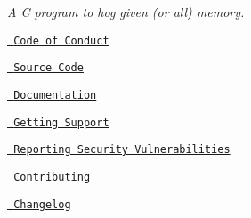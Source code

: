 \label{index_md_README}%
%
 {\itshape A C program to hog given (or all) memory.}


\begin{DoxyItemize}
\item \href{https://github.com/SFM61319/memhog/blob/main/CODE_OF_CONDUCT.md}{\texttt{ Code of Conduct}}
\item \href{https://github.com/SFM61319/memhog}{\texttt{ Source Code}}
\item \href{https://sfm61319.github.io/memhog/}{\texttt{ Documentation}}
\item \href{https://github.com/SFM61319/memhog/blob/main/SUPPORT.md}{\texttt{ Getting Support}}
\item \href{https://github.com/SFM61319/memhog/security/policy}{\texttt{ Reporting Security Vulnerabilities}}
\item \href{https://github.com/SFM61319/memhog/blob/main/CONTRIBUTING.md}{\texttt{ Contributing}}
\item \href{https://github.com/SFM61319/memhog/blob/main/CHANGELOG.md}{\texttt{ Changelog}} 
\end{DoxyItemize}